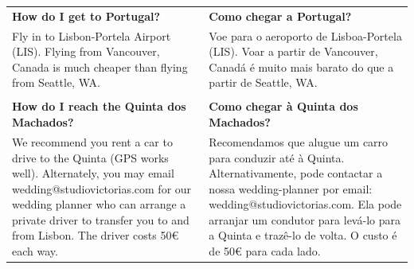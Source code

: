 \documentclass[6pt]{article}
\begin{document}
\pagestyle{empty}

\small
\begin{tabular}{p{2in}|p{2in}}
{\bf How do I get to Portugal?} & {\bf Como chegar a Portugal?}\\
  Fly in to Lisbon-Portela Airport (LIS). Flying from Vancouver, Canada is much cheaper than flying from Seattle, WA.
  &
  Voe para o aeroporto de Lisboa-Portela (LIS). Voar a partir de Vancouver, Canadá é muito mais barato do que a partir de Seattle, WA.
  \\
  &\\
  {\bf How do I reach the Quinta dos Machados?} & {\bf Como chegar à Quinta dos Machados?}\\
  We recommend you rent a car to drive to the Quinta (GPS works well). Alternately, you may email wedding@studiovictorias.com for our wedding planner who can arrange a private driver to transfer you to and from Lisbon. The driver costs 50\euro{} each way.
  &
  Recomendamos que alugue um carro para conduzir até à Quinta. Alternativamente, pode contactar a nossa wedding-planner por email: wedding@studiovictorias.com. Ela pode arranjar um condutor para levá-lo para a Quinta e trazê-lo de volta. O custo é de 50\euro{} para cada lado.\\


\end{tabular}
\end{document}
